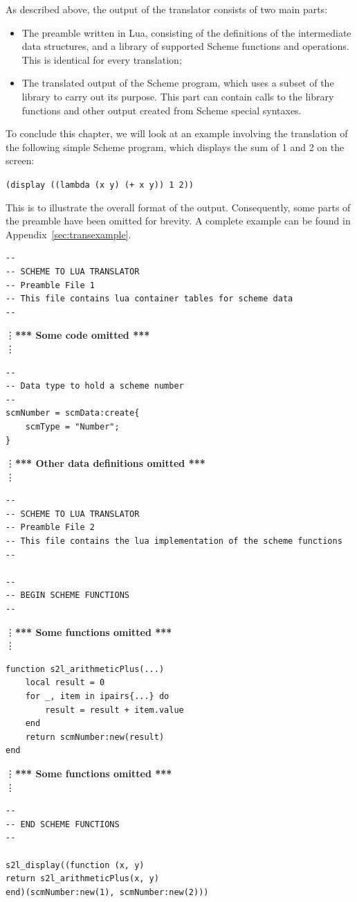 As described above, the output of the translator consists of two main parts:
\begin{itemize}
\item The preamble written in Lua, consisting of the definitions of the
intermediate data structures, and a library of supported Scheme functions and
operations. This is identical for every translation;
\item The translated output of the Scheme program, which uses a subset of the
library to carry out its purpose. This part can contain calls to the library
functions and other output created from Scheme special syntaxes.
\end{itemize}

To conclude this chapter, we will look at an example involving the translation
of the following simple Scheme program, which displays the sum of 1 and 2 on the
screen:
\begin{framed}
\centering
\texttt{(display ((lambda (x y) (+ x y)) 1 2))}
\end{framed}
This is to illustrate the overall format of the output. Consequently, some parts
of the preamble have been omitted for brevity. A complete example can be found
in Appendix~\ref{sec:transexample}.

\begin{framed}
\scriptsize
\begin{verbatim}
--
-- SCHEME TO LUA TRANSLATOR
-- Preamble File 1
-- This file contains lua container tables for scheme data
--
\end{verbatim}
\vdots \textbf{*** Some code omitted ***}\\ \vdots
\begin{verbatim}
--
-- Data type to hold a scheme number
--
scmNumber = scmData:create{
    scmType = "Number";
}
\end{verbatim}
\vdots \textbf{*** Other data definitions omitted ***}\\ \vdots
\begin{verbatim}
--
-- SCHEME TO LUA TRANSLATOR
-- Preamble File 2
-- This file contains the lua implementation of the scheme functions
--

--
-- BEGIN SCHEME FUNCTIONS
--
\end{verbatim}
\vdots \textbf{*** Some functions omitted ***}\\ \vdots
\begin{verbatim}
function s2l_arithmeticPlus(...)
    local result = 0
    for _, item in ipairs{...} do
        result = result + item.value
    end
    return scmNumber:new(result)
end
\end{verbatim}
\vdots \textbf{*** Some functions omitted ***}\\ \vdots
\begin{verbatim}
--
-- END SCHEME FUNCTIONS
--

s2l_display((function (x, y)
return s2l_arithmeticPlus(x, y)
end)(scmNumber:new(1), scmNumber:new(2)))
\end{verbatim}
\end{framed}

